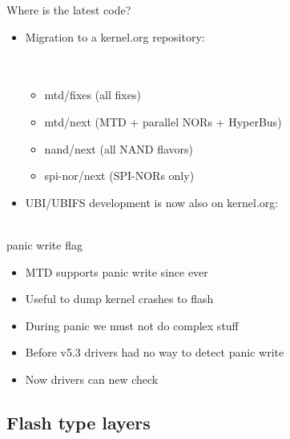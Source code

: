 \documentclass[aspectratio=169,obeyspaces,spaces,hyphens,dvipsnames]{beamer}
\begin{document}
\begin{frame}{Where is the latest code?}
  \begin{itemize}
  \item Migration to a kernel.org repository:\\
    \sout{}\\
    \\
    \begin{itemize}
    \item mtd/fixes (all fixes)
    \item mtd/next (MTD + parallel NORs + HyperBus)
    \item nand/next (all NAND flavors)
    \item spi-nor/next (SPI-NORs only)
    \end{itemize}
    \vfill
  \item UBI/UBIFS development is now also on kernel.org:\\
    \\
  \end{itemize}
\end{frame}

\begin{frame}{panic write flag}
  \begin{itemize}
  \item MTD supports panic write since ever
  \item Useful to dump kernel crashes to flash
  \item During panic we must not do complex stuff
  \item Before v5.3 drivers had no way to detect panic write
  \item Now drivers can new check 
  \end{itemize}
\end{frame}

\subsection{Flash type layers}
\end{document}
